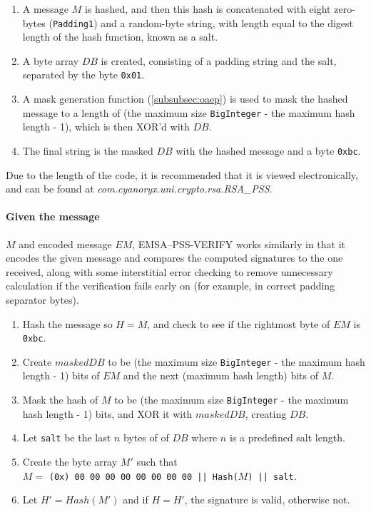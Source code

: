     \begin{enumerate}
      \item A message $M$ is hashed, and then this hash is concatenated with eight zero-bytes (\verb!Padding1!) and a random-byte string, with length equal to the digest length of the hash function, known as a salt.
      \item A byte array $DB$ is created, consisting of a padding string and the salt, separated by the byte \verb!0x01!.
      \item A mask generation function (\textsection\ref{subsubsec:oaep}) is used to mask the hashed message to a length of (the maximum size \verb!BigInteger! - the maximum hash length - 1), which is then XOR'd with $DB$.
      \item The final string is the masked $DB$ with the hashed message and a byte \verb!0xbc!.
    \end{enumerate}

    Due to the length of the code, it is recommended that it is viewed electronically, and can be found at \emph{com.cyanoryx.uni.crypto.rsa.RSA\_PSS}.
    
    \paragraph{Given the message} $M$ and encoded message $EM$, EMSA--PSS-VERIFY works similarly in that it encodes the given message and compares the computed signatures to the one received, along with some interstitial error checking to remove unnecessary calculation if the verification fails early on (for example, in correct padding separator bytes).
    
    \begin{enumerate}
      \item Hash the message so $H = M$, and check to see if the rightmost byte of $EM$ is \verb!0xbc!.
      \item Create $maskedDB$ to be (the maximum size \verb!BigInteger! - the maximum hash length - 1) bits of $EM$ and the next (maximum hash length) bits of $M$.
      \item Mask the hash of $M$ to be (the maximum size \verb!BigInteger! - the maximum hash length - 1) bits, and XOR it with $maskedDB$, creating $DB$.
      \item Let \verb!salt! be the last $n$ bytes of of $DB$ where $n$ is a predefined salt length.
      \item Create the byte array $M'$ such that \\ $M = $ \verb!(0x) 00 00 00 00 00 00 00 00 || Hash(!$M$\verb!) || salt!.
      \item Let $H' = Hash(M')$ and if $H = H'$, the signature is valid, otherwise not.
    \end{enumerate}
    
